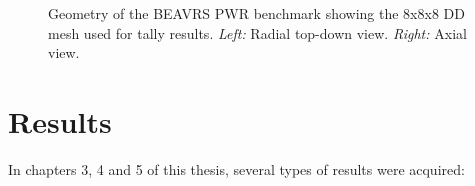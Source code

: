 \documentclass[12pt,twoside]{mitthesis-exec}
\begin{document}
%

\begin{figure}[h!]
    \centering
    \caption[Example domain mesh over the BEAVRS geometry]{Geometry of the
    BEAVRS PWR benchmark showing the 8x8x8 DD mesh used for tally results.
    \emph{Left:} Radial top-down view. \emph{Right:} Axial view.
    \label{fig:beavrs}}
\end{figure}

\newpage
\section*{Results}

In chapters 3, 4 and 5 of this thesis, several types of results were acquired:
\end{document}
